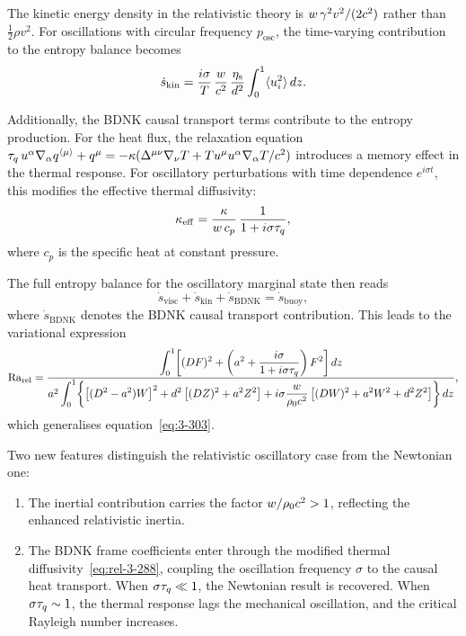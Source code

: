The kinetic energy density in the relativistic theory is
$w\,\gamma^2 v^2 / (2c^2)$ rather than $\tfrac{1}{2}\rho v^2$.
For oscillations with circular frequency $p_{\mathrm{osc}}$, the
time-varying contribution to the entropy balance becomes
\begin{equation}\label{eq:rel-3-287}
  \dot{s}_{\mathrm{kin}} = \frac{i\sigma}{T}\,
  \frac{w}{c^2}\,\frac{\eta_{\mathrm{s}}}{d^2}\int_0^1
  \langle u_i^2\rangle\,dz.
\end{equation}

Additionally, the BDNK causal transport terms contribute to the
entropy production.  For the heat flux, the relaxation equation
$\tau_{q}\,u^{\alpha}\nabla_{\alpha} q^{\langle\mu\rangle} + q^{\mu}
= -\kappa(\Delta^{\mu\nu}\nabla_{\nu}T
+ Tu^{\mu} u^{\alpha}\nabla_{\alpha}T/c^2)$
introduces a memory effect in the thermal response.  For oscillatory
perturbations with time dependence $e^{i\sigma t}$, this modifies the
effective thermal diffusivity:
\begin{equation}\label{eq:rel-3-288}
  \kappa_{\mathrm{eff}} = \frac{\kappa}{w\,c_p}
  \,\frac{1}{1 + i\sigma\tau_{q}},
\end{equation}
where $c_p$ is the specific heat at constant pressure.

The full entropy balance for the oscillatory marginal state then reads
\begin{equation}\label{eq:rel-3-289}
  \dot{s}_{\mathrm{visc}} + \dot{s}_{\mathrm{kin}}
  + \dot{s}_{\mathrm{BDNK}} = \dot{s}_{\mathrm{buoy}},
\end{equation}
where $\dot{s}_{\mathrm{BDNK}}$ denotes the BDNK causal transport
contribution.  This leads to the variational expression
\begin{equation}\label{eq:rel-3-290}
  \mathrm{Ra}_{\mathrm{rel}} = \frac{\displaystyle\int_0^1\!\left[(DF)^2
  + \left(a^2 + \frac{i\sigma}{1+i\sigma\tau_{q}}\right)F^2\right]dz}
  {a^2\displaystyle\int_0^1\!\left\{
  \left[(D^2 - a^2)W\right]^2 + d^2\left[(DZ)^2 + a^2 Z^2\right]
  + i\sigma\frac{w}{\rho_0 c^2}
  \left[(DW)^2 + a^2 W^2 + d^2 Z^2\right]
  \right\}dz},
\end{equation}
which generalises equation~\eqref{eq:3-303}.

\begin{relcorrection}
Two new features distinguish the relativistic oscillatory case from
the Newtonian one:
\begin{enumerate}
  \item The inertial contribution carries the factor
    $w / \rho_0 c^2 > 1$, reflecting the enhanced
    relativistic inertia.
  \item The BDNK frame coefficients enter through the
    modified thermal diffusivity~\eqref{eq:rel-3-288}, coupling the
    oscillation frequency $\sigma$ to the causal heat transport.
    When $\sigma\tau_{q} \ll 1$, the Newtonian result is recovered.
    When $\sigma\tau_{q} \sim 1$, the thermal response lags the
    mechanical oscillation, and the critical Rayleigh number increases.
\end{enumerate}
\end{relcorrection}

